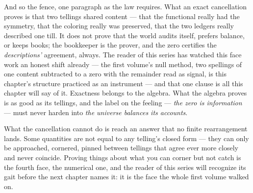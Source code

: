 And so the fence, one paragraph as the law requires. What an exact
cancellation proves is that two tellings shared content --- that the
functional really had the symmetry, that the coloring really was
preserved, that the two ledgers really described one till. It does not
prove that the world audits itself, prefers balance, or keeps books; the
bookkeeper is the prover, and the zero certifies the \emph{descriptions'}
agreement, always. The reader of this series has watched this face work
an honest shift already --- the first volume's null method, two spellings
of one content subtracted to a zero with the remainder read as signal,
is this chapter's structure practiced as an instrument --- and that one
clause is all this chapter will say of it. Exactness belongs to the
algebra. What the algebra proves is as good as its tellings, and the
label on the feeling --- \emph{the zero is information} --- must never
harden into \emph{the universe balances its accounts}.

What the cancellation cannot do is reach an answer that no finite
rearrangement lands. Some quantities are not equal to any telling's
closed form --- they can only be approached, cornered, pinned between
tellings that agree ever more closely and never coincide. Proving things
about what you can corner but not catch is the fourth face, the
numerical one, and the reader of this series will recognize its gait
before the next chapter names it: it is the face the whole first volume
walked on.
